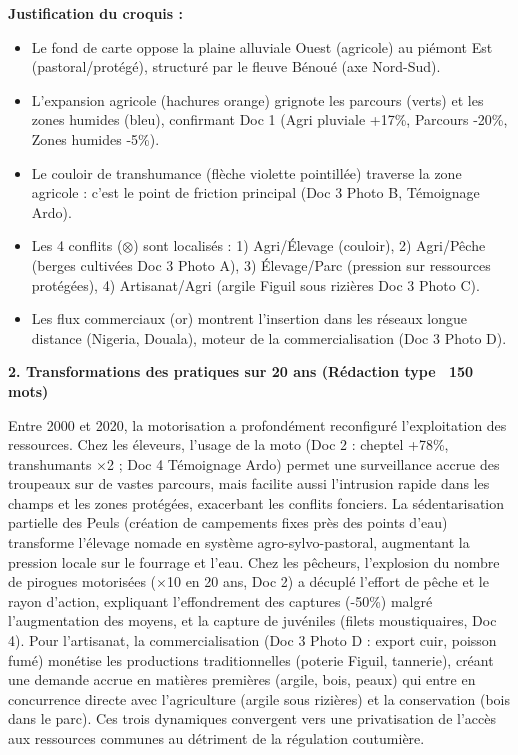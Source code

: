 \documentclass[11pt]{article}
\newcommand{\cle}[1]{{\popxbold\color{popdark}#1}}
\begin{document}
\begin{exoresolu}
\textbf{Justification du croquis :}
\begin{itemize}
    \item Le fond de carte oppose la plaine alluviale Ouest (agricole) au piémont Est (pastoral/protégé), structuré par le fleuve Bénoué (axe Nord-Sud).
    \item L'expansion agricole (hachures orange) grignote les parcours (verts) et les zones humides (bleu), confirmant Doc 1 (Agri pluviale +17\%, Parcours -20\%, Zones humides -5\%).
    \item Le couloir de transhumance (flèche violette pointillée) traverse la zone agricole : c'est le point de friction principal (Doc 3 Photo B, Témoignage Ardo).
    \item Les 4 conflits ($\otimes$) sont localisés : 1) Agri/Élevage (couloir), 2) Agri/Pêche (berges cultivées Doc 3 Photo A), 3) Élevage/Parc (pression sur ressources protégées), 4) Artisanat/Agri (argile Figuil sous rizières Doc 3 Photo C).
    \item Les flux commerciaux (or) montrent l'insertion dans les réseaux longue distance (Nigeria, Douala), moteur de la commercialisation (Doc 3 Photo D).
\end{itemize}

\textbf{2. Transformations des pratiques sur 20 ans (Rédaction type ~150 mots)}

Entre 2000 et 2020, la motorisation a profondément reconfiguré l'exploitation des ressources. Chez les éleveurs, l'usage de la moto (Doc 2 : cheptel +78\%, transhumants $\times$2 ; Doc 4 Témoignage Ardo) permet une surveillance accrue des troupeaux sur de vastes parcours, mais facilite aussi l'intrusion rapide dans les champs et les zones protégées, exacerbant les conflits fonciers. La sédentarisation partielle des Peuls (création de campements fixes près des points d'eau) transforme l'élevage nomade en système agro-sylvo-pastoral, augmentant la pression locale sur le fourrage et l'eau. Chez les pêcheurs, l'explosion du nombre de pirogues motorisées ($\times$10 en 20 ans, Doc 2) a décuplé l'effort de pêche et le rayon d'action, expliquant l'effondrement des captures (-50\%) malgré l'augmentation des moyens, et la capture de juvéniles (filets moustiquaires, Doc 4). Pour l'artisanat, la commercialisation (Doc 3 Photo D : export cuir, poisson fumé) monétise les productions traditionnelles (poterie Figuil, tannerie), créant une demande accrue en matières premières (argile, bois, peaux) qui entre en concurrence directe avec l'agriculture (argile sous rizières) et la conservation (bois dans le parc). Ces trois dynamiques convergent vers une \cle{privatisation de l'accès aux ressources communes} au détriment de la régulation coutumière.


\end{exoresolu}
\end{document}
